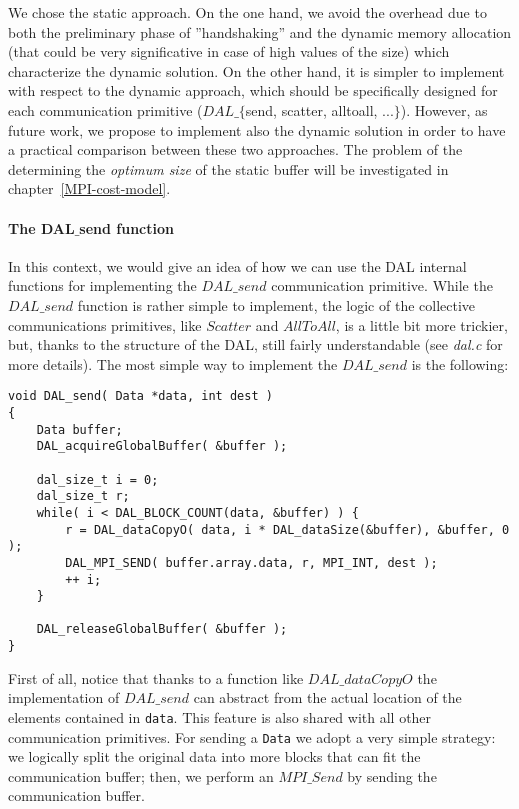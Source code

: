 We chose the static approach. On the one hand, we avoid the overhead due to both the preliminary phase of ''handshaking'' and the dynamic memory allocation (that could be very significative in case of high values of the size) which characterize the dynamic solution. On the other hand, it is simpler to implement with respect to the dynamic approach, which should be specifically designed for each communication primitive ($DAL\_\lbrace$send, scatter, alltoall, ...$\rbrace$). However, as future work, we propose to implement also the dynamic solution in order to have a practical comparison between these two approaches. The problem of the determining the \textit{optimum size} of the static buffer will be investigated in chapter~\ref{MPI-cost-model}.

\paragraph{The DAL$\_$send function}
In this context, we would give an idea of how we can use the DAL internal functions for implementing the $DAL\_send$ communication primitive. While the $DAL\_send$ function is rather simple to implement, the logic of the collective communications primitives, like $Scatter$ and $AllToAll$, is a little bit more trickier, but, thanks to the structure of the DAL, still fairly understandable (see \textit{dal.c} for more details). The most simple way to implement the $DAL\_send$ is the following:
\begin{lstlisting}
void DAL_send( Data *data, int dest )
{
	Data buffer;
	DAL_acquireGlobalBuffer( &buffer );

	dal_size_t i = 0;
	dal_size_t r;
	while( i < DAL_BLOCK_COUNT(data, &buffer) ) {
		r = DAL_dataCopyO( data, i * DAL_dataSize(&buffer), &buffer, 0 );
		DAL_MPI_SEND( buffer.array.data, r, MPI_INT, dest );
		++ i;
	}

	DAL_releaseGlobalBuffer( &buffer );
}
\end{lstlisting}
First of all, notice that thanks to a function like $DAL\_dataCopyO$ the implementation of $DAL\_send$ can abstract from the actual location of the elements contained in \texttt{data}. This feature is also shared with all other communication primitives. For sending a \texttt{Data} we adopt a very simple strategy: we logically split the original data into more blocks that can fit the communication buffer; then, we perform an $MPI\_Send$ by sending the communication buffer.
